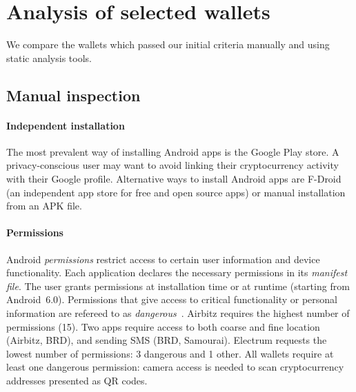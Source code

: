 \section{Analysis of selected wallets} \label{section:Ch04Analysis}

We compare the wallets which passed our initial criteria manually and using static analysis tools.

\subsection{Manual inspection}

\paragraph{Independent installation}
The most prevalent way of installing Android apps is the Google Play store.
A privacy-conscious user may want to avoid linking their cryptocurrency activity with their Google profile.
Alternative ways to install Android apps are F-Droid (an independent app store for free and open source apps) or manual installation from an APK file.

\paragraph{Permissions}
Android \textit{permissions} restrict access to certain user information and device functionality.
Each application declares the necessary permissions in its \textit{manifest file}.
The user grants permissions at installation time or at runtime (starting from Android~6.0).
Permissions that give access to critical functionality or personal information are refereed to as \textit{dangerous}~\cite{Android}.
Airbitz requires the highest number of permissions (15).
Two apps require access to both coarse and fine location (Airbitz, BRD), and sending SMS (BRD, Samourai).
Electrum requests the lowest number of permissions: 3 dangerous and 1 other.
All wallets require at least one dangerous permission: camera access is needed to scan cryptocurrency addresses presented as QR codes.

